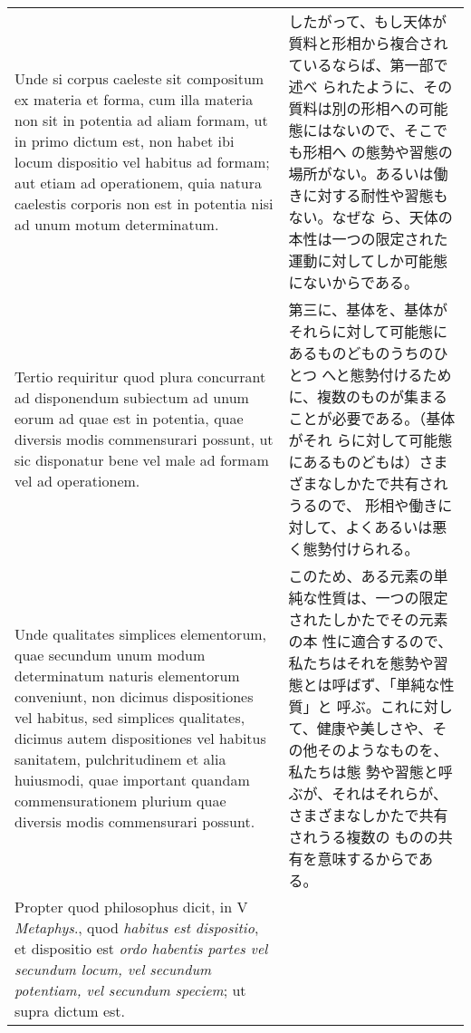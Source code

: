 \documentclass[10pt]{jsarticle} %
\begin{document}
\begin{longtable}{p{21em}p{21em}}
\\

Unde si corpus
caeleste sit compositum ex materia et forma, cum illa materia non sit
in potentia ad aliam formam, ut in primo dictum est, non habet ibi
locum dispositio vel habitus ad formam; aut etiam ad operationem, quia
natura caelestis corporis non est in potentia nisi ad unum motum
determinatum. 

&

したがって、もし天体が質料と形相から複合されているならば、第一部で述べ
られたように、その質料は別の形相への可能態にはないので、そこでも形相へ
の態勢や習態の場所がない。あるいは働きに対する耐性や習態もない。なぜな
ら、天体の本性は一つの限定された運動に対してしか可能態にないからである。

\\

Tertio requiritur quod plura concurrant ad disponendum
subiectum ad unum eorum ad quae est in potentia, quae diversis modis
commensurari possunt, ut sic disponatur bene vel male ad formam vel ad
operationem. 

&

第三に、基体を、基体がそれらに対して可能態にあるものどものうちのひとつ
へと態勢付けるために、複数のものが集まることが必要である。（基体がそれ
らに対して可能態にあるものどもは）さまざまなしかたで共有されうるので、
形相や働きに対して、よくあるいは悪く態勢付けられる。

\\

Unde qualitates simplices elementorum, quae secundum unum
modum determinatum naturis elementorum conveniunt, non dicimus
dispositiones vel habitus, sed simplices qualitates, dicimus autem
dispositiones vel habitus sanitatem, pulchritudinem et alia huiusmodi,
quae important quandam commensurationem plurium quae diversis modis
commensurari possunt. 

&

このため、ある元素の単純な性質は、一つの限定されたしかたでその元素の本
性に適合するので、私たちはそれを態勢や習態とは呼ばず、「単純な性質」と
呼ぶ。これに対して、健康や美しさや、その他そのようなものを、私たちは態
勢や習態と呼ぶが、それはそれらが、さまざまなしかたで共有されうる複数の
ものの共有を意味するからである。

\\

Propter quod philosophus dicit, in V {\itshape Metaphys}.,
quod {\itshape habitus est dispositio}, et dispositio est {\itshape ordo habentis partes
vel secundum locum, vel secundum potentiam, vel secundum speciem}; ut
supra dictum est. 


\end{longtable}
\end{document}
